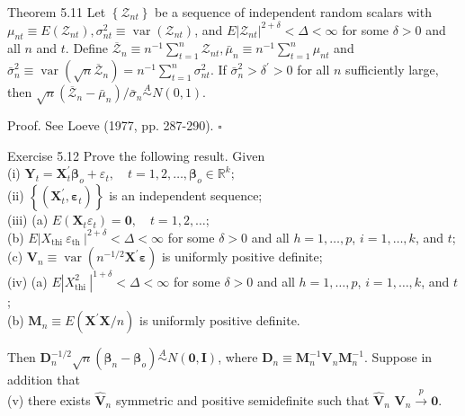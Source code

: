 \documentclass[10pt]{article}
\begin{document}
Theorem 5.11 Let $\left\{\mathcal{Z}_{n t}\right\}$ be a sequence of independent random scalars with $\mu_{n t} \equiv E\left(\mathcal{Z}_{n t}\right), \sigma_{n t}^{2} \equiv \operatorname{var}\left(\mathcal{Z}_{n t}\right)$, and $E\left|\mathcal{Z}_{n t}\right|^{2+\delta}<\Delta<\infty$ for some $\delta>0$ and all $n$ and $t$. Define $\overline{\mathcal{Z}}_{n} \equiv n^{-1} \sum_{t=1}^{n} \mathcal{Z}_{n t}, \bar{\mu}_{n} \equiv n^{-1} \sum_{t=1}^{n} \mu_{n t}$ and $\bar{\sigma}_{n}^{2} \equiv \operatorname{var}\left(\sqrt{n} \overline{\mathcal{Z}}_{n}\right)=n^{-1} \sum_{t=1}^{n} \sigma_{n t}^{2}$. If $\bar{\sigma}_{n}^{2}>\delta^{\prime}>0$ for all $n$ sufficiently large, then $\sqrt{n}\left(\overline{\mathcal{Z}}_{n}-\bar{\mu}_{n}\right) / \bar{\sigma}_{n} \stackrel{A}{\sim} N(0,1)$.

Proof. See Loeve (1977, pp. 287-290). \(\square\)

Exercise 5.12 Prove the following result. Given\\
(i) $\mathbf{Y}_{t}=\mathbf{X}_{t}^{\prime} \boldsymbol{\beta}_{o}+\varepsilon_{t}, \quad t=1,2, \ldots, \boldsymbol{\beta}_{o} \in \mathbb{R}^{k} ;$\\
(ii) $\left\{\left(\mathbf{X}_{t}^{\prime}, \boldsymbol{\varepsilon}_{t}\right)\right\}$ is an independent sequence;\\
(iii) (a) $E\left(\mathbf{X}_{t} \varepsilon_{t}\right)=\mathbf{0}, \quad t=1,2, \ldots$;\\
(b) $E\left|X_{\text {thi }} \varepsilon_{\text {th }}\right|^{2+\delta}<\Delta<\infty$ for some $\delta>0$ and all $h=1, \ldots, p$, $i=1, \ldots, k$, and $t$;\\
(c) $\mathbf{V}_{n} \equiv \operatorname{var}\left(n^{-1 / 2} \mathbf{X}^{\prime} \boldsymbol{\varepsilon}\right)$ is uniformly positive definite;\\
(iv) (a) $E\left|X_{\text {thi }}^{2}\right|^{1+\delta}<\Delta<\infty$ for some $\delta>0$ and all $h=1, \ldots, p$, $i=1, \ldots, k$, and $t$;\\
(b) $\mathbf{M}_{n} \equiv E\left(\mathbf{X}^{\prime} \mathbf{X} / n\right)$ is uniformly positive definite.

Then $\mathbf{D}_{n}^{-1 / 2} \sqrt{n}\left(\hat{\boldsymbol{\beta}}_{n}-\boldsymbol{\beta}_{o}\right) \stackrel{A}{\sim} N(\mathbf{0}, \mathbf{I})$, where $\mathbf{D}_{n} \equiv \mathbf{M}_{n}^{-1} \mathbf{V}_{n} \mathbf{M}_{n}^{-1}$. Suppose in addition that\\
(v) there exists $\hat{\mathbf{V}}_{n}$ symmetric and positive semidefinite such that $\hat{\mathbf{V}}_{n}$ $\mathbf{V}_{n} \xrightarrow{p} \mathbf{0}$.
\end{document}
